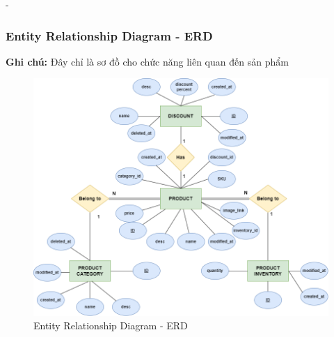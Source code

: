 \begin {list} {-}{}
\subsubsection {Entity Relationship Diagram - ERD}
\textbf{Ghi chú:} Đây chỉ là sơ đồ cho chức năng liên quan đến sản phẩm
\begin{figure}[h]
    \centering
    \includegraphics[scale=0.5]{images/hieu/chap-3/database-diagram.png}
    \caption{Entity Relationship Diagram - ERD}
\end{figure}

\end{list}
